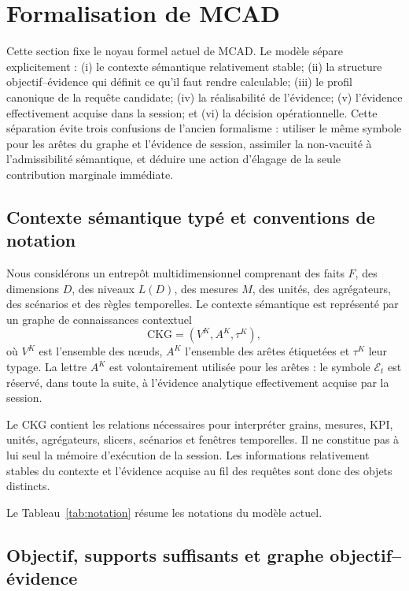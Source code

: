\documentclass[journal]{IEEEtran}
\begin{document}
\section{Formalisation de MCAD}
\label{sec:formal}

Cette section fixe le noyau formel actuel de MCAD. Le modèle sépare explicitement : (i) le contexte sémantique relativement stable; (ii) la structure objectif--évidence qui définit ce qu'il faut rendre calculable; (iii) le profil canonique de la requête candidate; (iv) la réalisabilité de l'évidence; (v) l'évidence effectivement acquise dans la session; et (vi) la décision opérationnelle. Cette séparation évite trois confusions de l'ancien formalisme : utiliser le même symbole pour les arêtes du graphe et l'évidence de session, assimiler la non-vacuité à l'admissibilité sémantique, et déduire une action d'élagage de la seule contribution marginale immédiate.

\subsection{Contexte sémantique typé et conventions de notation}

Nous considérons un entrepôt multidimensionnel comprenant des faits $F$, des dimensions $D$, des niveaux $L(D)$, des mesures $M$, des unités, des agrégateurs, des scénarios et des règles temporelles. Le contexte sémantique est représenté par un graphe de connaissances contextuel
\[
\mathrm{CKG}=(V^{K},A^{K},\tau^{K}),
\]
où $V^{K}$ est l'ensemble des nœuds, $A^{K}$ l'ensemble des arêtes étiquetées et $\tau^{K}$ leur typage. La lettre $A^{K}$ est volontairement utilisée pour les arêtes : le symbole $\mathcal{E}_t$ est réservé, dans toute la suite, à l'évidence analytique effectivement acquise par la session.

Le CKG contient les relations nécessaires pour interpréter grains, mesures, KPI, unités, agrégateurs, slicers, scénarios et fenêtres temporelles. Il ne constitue pas à lui seul la mémoire d'exécution de la session. Les informations relativement stables du contexte et l'évidence acquise au fil des requêtes sont donc des objets distincts.

Le Tableau~\ref{tab:notation} résume les notations du modèle actuel.



\subsection{Objectif, supports suffisants et graphe objectif--évidence}
\end{document}
